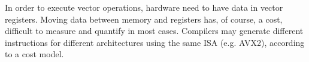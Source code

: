 In order to execute vector operations, hardware need to have data in vector 
registers. Moving data between memory and registers has, of course, a cost, 
difficult to measure and quantify in most cases. Compilers may generate 
different instructions for different architectures using the same ISA (e.g. 
AVX2), according to a cost model. 